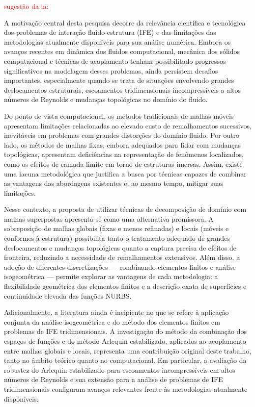 \documentclass[tese_patricia.tex]{subfiles}
\begin{document}
\textcolor{red}{sugestão da ia:}
{\color{green}
A motivação central desta pesquisa decorre da relevância científica e tecnológica dos problemas de interação fluido-estrutura (IFE) e das limitações das metodologias atualmente disponíveis para sua análise numérica. Embora os avanços recentes em dinâmica dos fluidos computacional, mecânica dos sólidos computacional e técnicas de acoplamento tenham possibilitado progressos significativos na modelagem desses problemas, ainda persistem desafios importantes, especialmente quando se trata de situações envolvendo grandes deslocamentos estruturais, escoamentos tridimensionais incompressíveis a altos números de Reynolds e mudanças topológicas no domínio do fluido.

Do ponto de vista computacional, os métodos tradicionais de malhas móveis apresentam limitações relacionadas ao elevado custo de remalhamentos sucessivos, inevitáveis em problemas com grandes distorções do domínio fluido. Por outro lado, os métodos de malhas fixas, embora adequados para lidar com mudanças topológicas, apresentam deficiências na representação de fenômenos localizados, como os efeitos de camada limite em torno de estruturas imersas. Assim, existe uma lacuna metodológica que justifica a busca por técnicas capazes de combinar as vantagens das abordagens existentes e, ao mesmo tempo, mitigar suas limitações.

Nesse contexto, a proposta de utilizar técnicas de decomposição de domínio com malhas superpostas apresenta-se como uma alternativa promissora. A sobreposição de malhas globais (fixas e menos refinadas) e locais (móveis e conformes à estrutura) possibilita tanto o tratamento adequado de grandes deslocamentos e mudanças topológicas quanto a captura precisa de efeitos de fronteira, reduzindo a necessidade de remalhamentos extensivos. Além disso, a adoção de diferentes discretizações — combinando elementos finitos e análise isogeométrica — permite explorar as vantagens de cada metodologia: a flexibilidade geométrica dos elementos finitos e a descrição exata de superfícies e continuidade elevada das funções NURBS.

Adicionalmente, a literatura ainda é incipiente no que se refere à aplicação conjunta da análise isogeométrica e do método dos elementos finitos em problemas de IFE tridimensionais. A investigação do método da combinação dos espaços de funções e do método Arlequin estabilizado, aplicados ao acoplamento entre malhas globais e locais, representa uma contribuição original deste trabalho, tanto no âmbito teórico quanto no computacional. Em particular, a avaliação da robustez do Arlequin estabilizado para escoamentos incompressíveis em altos números de Reynolds e sua extensão para a análise de problemas de IFE tridimensionais configuram avanços relevantes frente às metodologias atualmente disponíveis.

}
\end{document}
